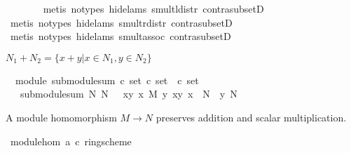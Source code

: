 \begin{isabellebody}
\ \ \ \ \ \ \isamarkupfalse%
\ {\isacharparenleft}metis\ {\isacharparenleft}no{\isacharunderscore}types{\isacharcomma}\ hide{\isacharunderscore}lams{\isacharparenright}\ smult{\isacharunderscore}l{\isacharunderscore}distr\ contra{\isacharunderscore}subsetD{\isacharparenright}\isanewline
\ \ \ \ \ \isamarkupfalse%
\ {\isacharparenleft}metis\ {\isacharparenleft}no{\isacharunderscore}types{\isacharcomma}\ hide{\isacharunderscore}lams{\isacharparenright}\ smult{\isacharunderscore}r{\isacharunderscore}distr\ contra{\isacharunderscore}subsetD{\isacharparenright}\isanewline
\ \ \ \ \isamarkupfalse%
\ {\isacharparenleft}metis\ {\isacharparenleft}no{\isacharunderscore}types{\isacharcomma}\ hide{\isacharunderscore}lams{\isacharparenright}\ smult{\isacharunderscore}assoc{}\ contra{\isacharunderscore}subsetD{\isacharparenright}\isanewline
{}\isamarkupfalse%
%
\endisatagproof
{\isafoldproof}%
%
\isadelimproof
%
\endisadelimproof
%
\begin{isamarkuptext}%
$N_1+N_2=\{x+y | x\in N_1,y\in N_2\}$%
\end{isamarkuptext}%
\isamarkuptrue%
\isamarkupfalse%
\ {\isacharparenleft}\ module{\isacharparenright}\ submodule{\isacharunderscore}sum{\isacharcolon}{\isacharcolon}\ {\isachardoublequoteopen}{\isacharbrackleft}{\isacharprime}c\ set{\isacharcomma}\ {\isacharprime}c\ set{\isacharbrackright}\ {\isasymRightarrow}\ {\isacharprime}c\ set{\isachardoublequoteclose}\isanewline
\ \ \ {\isachardoublequoteopen}submodule{\isacharunderscore}sum\ N{}\ N{}\ {\isacharequal}\ {\isacharparenleft}{\isasymlambda}\ {\isacharparenleft}x{\isacharcomma}y{\isacharparenright}{\isachardot}\ x\ {\isasymoplus}\isactrlbsub M\isactrlesub \ y{\isacharparenright}\ {\isacharbackquote}{\isacharbraceleft}{\isacharparenleft}x{\isacharcomma}y{\isacharparenright}{\isachardot}\ x{\isasymin}\ \ N{}\ {\isasymand}\ y{\isasymin}\ N{}{\isacharbraceright}{\isachardoublequoteclose}%
\begin{isamarkuptext}%
A module homomorphism $M\to N$ preserves addition and scalar multiplication.%
\end{isamarkuptext}%
\isamarkuptrue%
\isamarkupfalse%
\ module{\isacharunderscore}hom{\isacharcolon}{\isacharcolon}\ {\isachardoublequoteopen}{\isacharbrackleft}{\isacharparenleft}{\isacharprime}a{\isacharcomma}\ {\isacharprime}c{}{\isacharparenright}\ ring{\isacharunderscore}scheme{\isacharcomma}\ \isanewline

\end{isabellebody}
